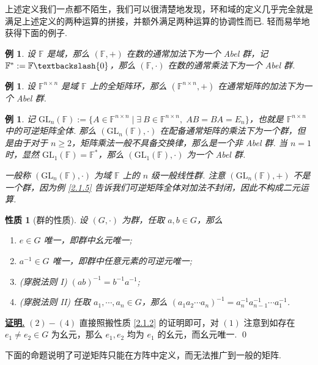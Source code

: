 \documentclass[10pt,openany]{article}
\theoremstyle{thmstyle} %
\theoremstyle{defstyle} %
\theoremstyle{prostyle} %
\newtheorem{property}[theorem]{性质}
\theoremstyle{exastyle}
\newtheorem{example}[theorem]{例}
\theoremstyle{remstyle}
\renewenvironment{proof}[1][证明]{\par\underline{\textbf{#1.}} \;\fangsong}{\qed\par}
\newcommand{\F}{\mathbb{F}}
\newcommand{\gf}{\text{GL}_n(\mathbb{F})}
\newcommand{\n}{^{n \times n}}
\begin{document}
上述定义我们一点都不陌生，我们可以很清楚地发现，环和域的定义几乎完全就是满足上述定义的两种运算的拼接，并额外满足两种运算的协调性而已. 轻而易举地获得下面的例子.

\begin{example}
	设 \( \F \) 是域，那么 \( (\F,+) \) 在数的通常加法下为一个 Abel 群，记 \( \F^*:=\F \textbackslash \{0\} \)，那么 \( (\F,\cdot) \) 在数的通常乘法下为一个 Abel 群. 
\end{example}

\begin{example}
	设 \( \F\n \) 是域 \( \F \) 上的全矩阵环，那么 \( (\F\n,+) \) 在通常矩阵的加法下为一个 Abel 群. 
\end{example}

\begin{example}
	记 \( \gf:=\{ A \in \F\n \mid \exists \ B \in \F\n, \; AB=BA=E_n \} \)，也就是 \( \F\n \) 中的可逆矩阵全体. 那么 \( (\gf,\cdot) \) 在配备通常矩阵的乘法下为一个群，但是由于对于 \( n \geq 2 \)，矩阵乘法一般不具备交换律，那么是一个非 Abel 群. 当 \( n=1 \) 时，显然 \( \text{GL}_1(\mathbb{F})= \F^* \)，那么 \( (\text{GL}_1(\mathbb{F}),\cdot) \) 为一个 Abel 群. 
	
	一般称 \( (\gf,\cdot) \) 为域 \( \F \) 上的 \( n \) 级一般线性群. 注意 \( (\gf,+) \) 不是一个群，因为例 \ref{2.1.5} 告诉我们可逆矩阵全体对加法不封闭，因此不构成二元运算.
\end{example}

\begin{property}[群的性质]
	设 \( (G,\cdot) \) 为群，任取 \( a,b \in G \)，那么
	\begin{enumerate}
		\item \( e \in G \) 唯一，即群中幺元唯一;
		\item \( a^{-1} \in G \) 唯一，即群中任意元素的可逆元唯一;
		\item (穿脱法则 I) \( (ab)^{-1}=b^{-1}a^{-1} \);
		\item (穿脱法则 II) 任取 \( a_1,\cdots,a_n \in G \)，那么 \( (a_1a_2\cdots a_n)^{-1}=a_n^{-1}a_{n-1}^{-1}\cdots a_1^{-1} \).
	\end{enumerate}
\end{property}

\begin{proof}
	\( (2)-(4) \) 直接照搬性质 \ref{2.1.2} 的证明即可，对 \( (1) \) 注意到如存在 \( e_1 \neq e_2 \in G \) 为幺元，那么 \( e_1,e_2 \) 均为 \( e_1 \) 的幺元，而幺元唯一.
\end{proof}

下面的命题说明了可逆矩阵只能在方阵中定义，而无法推广到一般的矩阵. 
\end{document}

